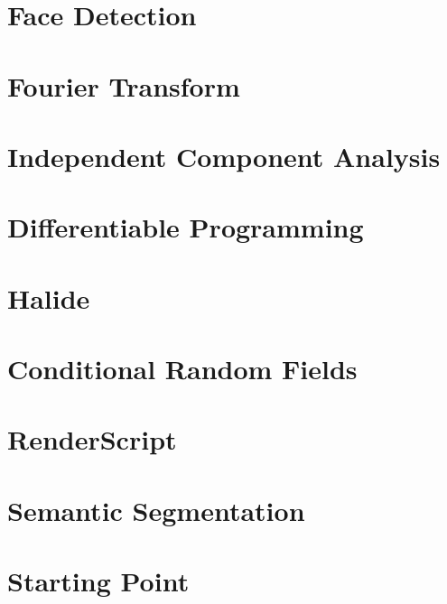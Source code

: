\section{Face Detection}
\section{Fourier Transform}
\section{Independent Component Analysis}
\section{Differentiable Programming}
\section{Halide}
\section{Conditional Random Fields}
\section{RenderScript}
\section{Semantic Segmentation}
\section{Starting Point}